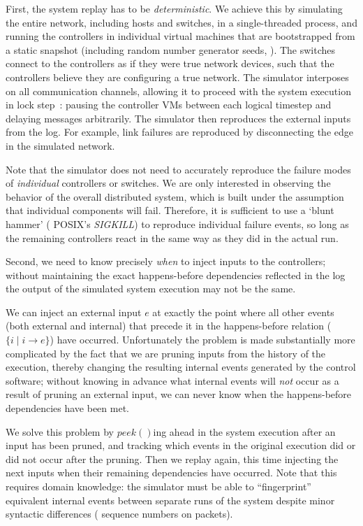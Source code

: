 {First, the system replay has to be {\em deterministic}.
We achieve this by simulating the entire network, including hosts and
switches, in a single-threaded process, and running the controllers in
individual virtual machines that are
bootstrapped from a static snapshot (including random number generator
seeds, \etc{}). The switches connect to the controllers as if they were true
network devices, such that the controllers believe they are configuring a true
network. The simulator interposes on all communication channels,
allowing it to proceed with the system execution in
lock step~\cite{Dunlap:2002:REI:844128.844148}:
pausing the controller VMs between each logical timestep and delaying messages
arbitrarily. The simulator then reproduces the external inputs from the log.
For example, link failures are reproduced by disconnecting the edge in
the simulated network.

Note that the simulator does not need
to accurately reproduce the failure modes of {\em individual} controllers or switches.
We are only interested in observing the behavior of the overall distributed system, which is
built under the assumption that individual components will fail.
Therefore, it is sufficient to use a `blunt hammer' (\eg{} POSIX's {\em SIGKILL}) to reproduce individual
failure events, so long as the remaining controllers react in the same
way as they did in the actual run.

Second, we need to know precisely {\em when} to inject inputs to the controllers;
without maintaining the exact happens-before dependencies reflected in the
log the output of the simulated system execution may not be the same.

We can inject an external input $e$ at exactly the point where all other
events (both external and internal) that precede it in the happens-before
relation ($\{i \mid i \rightarrow e\}$) have occurred. Unfortunately the problem is made
substantially more complicated by the fact that we are pruning inputs from the
history of the execution,
thereby changing the resulting internal events generated by the control
software; without knowing in advance what internal events will {\em not} occur
as a result of pruning an external input, we can never know when the happens-before
dependencies have been met.

We solve this problem by $peek()$ing ahead in the system execution after an
input has been pruned, and tracking which events in the original execution did
or did not occur after the pruning. Then we replay again, this time injecting
the next inputs when their remaining dependencies have occurred. Note that
this requires domain knowledge: the simulator must be able to ``fingerprint''
equivalent internal events between separate runs of
the system despite minor
syntactic differences (\eg{} sequence numbers on packets).

}
